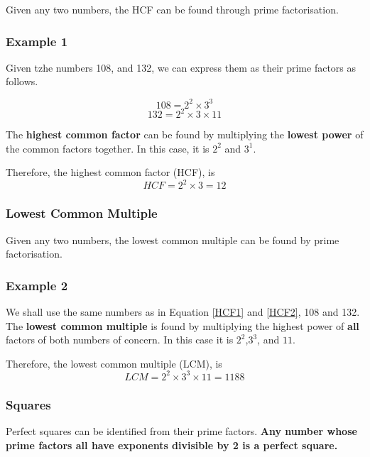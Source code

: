 \documentclass{report}
\begin{document}
Given any two numbers, the HCF can be found through prime factorisation.

\subsubsection*{Example 1}

\begin{flushleft}
    Given tzhe numbers 108, and 132, we can express them as their prime factors as follows.\par
    \begin{equation} \label{HCF1}
    108=2^2\times3^3
    \end{equation}
    \begin{equation}\label{HCF2}
        132=2^2\times3\times11
    \end{equation}

The \textbf{highest common factor} can be found by multiplying the \textbf{lowest power} of the common factors together. In this case, it is $2^2$ and $3^1$.
\par
Therefore, the highest common factor (HCF), is
    \[HCF=2^2\times3=12\]
\par

\subsubsection*{Lowest Common Multiple}
Given any two numbers, the lowest common multiple can be found by prime factorisation.

\subsubsection*{Example 2}
We shall use the same numbers as in Equation \ref{HCF1} and \ref{HCF2}, 108 and 132.
The \textbf{lowest common multiple} is found by multiplying the highest power of \textbf{all} factors of both numbers of concern. In this case it is $2^2$,$3^3$, and $11$.\par
Therefore, the lowest common multiple (LCM), is
\[LCM=2^2\times3^3\times11=1188\]

\subsubsection*{Squares}
Perfect squares can be identified from their prime factors.
\newline
\textbf{Any number whose prime factors all have exponents divisible by 2 is a perfect square.}


\end{flushleft}
\end{document}
